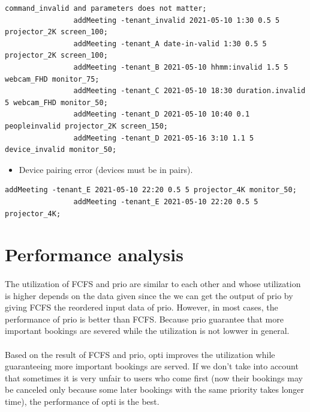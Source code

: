 \documentclass{article}
\begin{document}
            \begin{Verbatim}[gobble=8]
                command_invalid and parameters does not matter;
                addMeeting -tenant_invalid 2021-05-10 1:30 0.5 5 projector_2K screen_100;
                addMeeting -tenant_A date-in-valid 1:30 0.5 5 projector_2K screen_100;
                addMeeting -tenant_B 2021-05-10 hhmm:invalid 1.5 5 webcam_FHD monitor_75;
                addMeeting -tenant_C 2021-05-10 18:30 duration.invalid 5 webcam_FHD monitor_50;
                addMeeting -tenant_D 2021-05-10 10:40 0.1 peopleinvalid projector_2K screen_150;
                addMeeting -tenant_D 2021-05-16 3:10 1.1 5 device_invalid monitor_50;
            \end{Verbatim}
            \begin{itemize}
            \item Device pairing error (devices must be in pairs).
            \end{itemize}
            \begin{Verbatim}[gobble=8]
                addMeeting -tenant_E 2021-05-10 22:20 0.5 5 projector_4K monitor_50; 
                addMeeting -tenant_E 2021-05-10 22:20 0.5 5 projector_4K; 
            \end{Verbatim}
        

    \cleardoublepage
    \section{Performance analysis}
    \paragraph{}
        The utilization of FCFS and prio are similar to each other and whose utilization is higher depends on the data given since the we can get the output of prio by giving FCFS the reordered input data of prio. However, in most cases, the performance of prio is better than FCFS. Because prio guarantee that more important bookings are severed while the utilization is not lowwer in general.  
    \paragraph{}
        Based on the result of FCFS and prio, opti improves the utilization while guaranteeing more important bookings are served. If we don't take into account that sometimes it is very unfair to users who come first (now their bookings may be canceled only because some later bookings with the same priority takes longer time), the performance of opti is the best.
\end{document}
